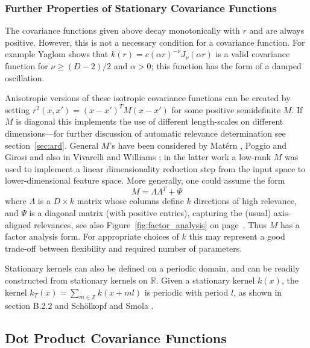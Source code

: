 \documentclass[11pt]{book}
\begin{document}
\subsubsection{Further Properties of Stationary Covariance Functions}

The covariance functions given above decay monotonically with $r$ and are always positive. However, this is not a necessary condition for a covariance function. For example Yaglom \cite{yaglom1987} shows that $k(r) = c(\alpha r)^{-\nu} J_\nu(\alpha r)$ is a valid covariance function for $\nu \geq (D-2)/2$ and $\alpha > 0$; this function has the form of a damped oscillation.

Anisotropic versions of these isotropic covariance functions can be created by setting $r^2(x, x') = (x - x')^T M (x - x')$ for some positive semidefinite $M$. If $M$ is diagonal this implements the use of different length-scales on different dimensions—for further discussion of automatic relevance determination see section~\ref{sec:ard}. General $M$'s have been considered by Matérn \cite{matern1960}, Poggio and Girosi \cite{poggio1990} and also in Vivarelli and Williams \cite{vivarelli1999}; in the latter work a low-rank $M$ was used to implement a linear dimensionality reduction step from the input space to lower-dimensional feature space. More generally, one could assume the form
\begin{equation}
\label{eq:factor_analysis_M}
M = \Lambda \Lambda^T + \Psi
\end{equation}
where $\Lambda$ is a $D \times k$ matrix whose columns define $k$ directions of high relevance, and $\Psi$ is a diagonal matrix (with positive entries), capturing the (usual) axis-aligned relevances, see also Figure~\ref{fig:factor_analysis} on page~\pageref{fig:factor_analysis}. Thus $M$ has a factor analysis form. For appropriate choices of $k$ this may represent a good trade-off between flexibility and required number of parameters.

Stationary kernels can also be defined on a periodic domain, and can be readily constructed from stationary kernels on $\mathbb{R}$. Given a stationary kernel $k(x)$, the kernel $k_T(x) = \sum_{m \in \mathbb{Z}} k(x + ml)$ is periodic with period $l$, as shown in section B.2.2 and Schölkopf and Smola \cite{scholkopf2002}.

\subsection{Dot Product Covariance Functions}
\label{sec:dotproduct}
\end{document}
